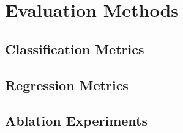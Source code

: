 \chapter{Evaluation Methods}

\section{Classification Metrics}

\section{Regression Metrics}

\section{Ablation Experiments}
